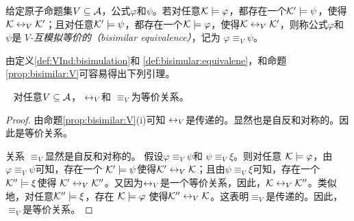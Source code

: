 \begin{definition}\label{def:bisimular:equivalene}
	给定原子命题集$V\subseteq {\cal A}$，公式$\varphi$和$\psi$。若对任意${\cal K}\models \varphi$，都存在一个${\cal K}'\models\psi$，使得${\cal K}\leftrightarrow_V{\cal K}'$；且对任意${\cal K}'\models\psi$，都存在一个${\cal K}\models \varphi$，使得${\cal K}\leftrightarrow_V{\cal K}'$，则称公式$\varphi$和 $\psi$是 {\em $V$-互模拟等价的（bisimilar equivalence）}，记为 $\varphi\equiv_V\psi$。
\end{definition}

由定义\ref{def:VInd:bisimulation}和 \ref{def:bisimular:equivalene}，和命题\ref{prop:bisimilar:V}可容易得出下列引理。
\begin{lemma}~\label{lem:eqR}
	对任意$V\subseteq\cal A$，  $\leftrightarrow_V$和 $\equiv_V$为等价关系。
\end{lemma}
\begin{proof}
	由命题\ref{prop:bisimilar:V}(i)可知 $\leftrightarrow_V$是传递的。显然也是自反和对称的。因此是等价关系。
	
	关系 $\equiv_V$显然是自反和对称的。
	假设$\varphi\equiv_V\psi$和 $\psi\equiv_V\xi$。则对任意 ${\cal K}\models\varphi$，由$\varphi\equiv_V\psi$可知，存在一个 ${\cal K}'\models\psi$使得${\cal K}'\leftrightarrow_V{\cal K}$；且由$\psi\equiv_V\xi$可知，存在一个 ${\cal K}''\models\xi$使得
	${\cal K}'\leftrightarrow_V{\cal K}''$。又因为$\leftrightarrow_V$是一个等价关系，因此，${\cal K}\leftrightarrow_V{\cal K}''$。类似地，对任意${\cal K}''\models\xi$，存在 ${\cal K}\models \varphi$ 使得${\cal K}''\leftrightarrow_V{\cal K}$。这表明$\equiv_V$是传递的。因此，$\equiv_V$是等价关系。
\end{proof} 


